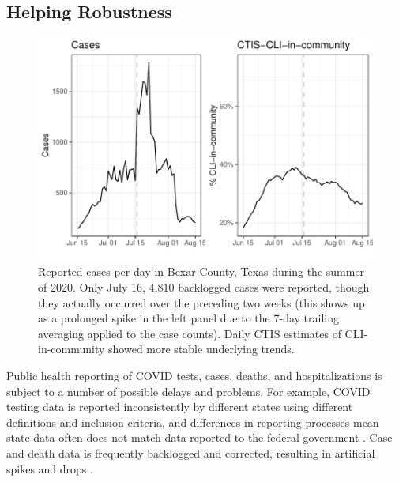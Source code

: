 \documentclass[9pt,twocolumn,twoside,lineno]{pnas-new}
\begin{document}
\subsection{Helping Robustness}

\begin{figure}[t]
  \centering
  \includegraphics[width=\columnwidth]{fig/bexar_compare.pdf}
  \caption{Reported cases per day in Bexar County, Texas during the summer of
    2020. Only July 16, 4,810 backlogged cases were reported, though they
    actually occurred over the preceding two weeks (this shows up as a prolonged
    spike in the left panel due to the 7-day trailing averaging applied to the
    case counts). Daily CTIS estimates of CLI-in-community showed more stable
    underlying trends.}
  \label{fig:bexar-compare}
\end{figure}

Public health reporting of COVID tests, cases, deaths, and hospitalizations is
subject to a number of possible delays and problems. For example, COVID testing
data is reported inconsistently by different states using different definitions
and inclusion criteria, and differences in reporting processes mean state data
often does not match data reported to the federal government
\cite{Schechtman:2021}. Case and death data is frequently backlogged and
corrected, resulting in artificial spikes and drops \cite{Simon:2021,
  ArvisaisAnhalt:2021}.
\end{document}
